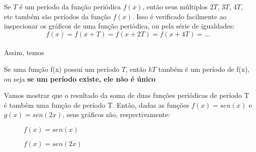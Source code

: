 Se $T$ é um período da função periódica $f(x)$, então seus múltiplos $2T$, $3T$, $4T$, etc 
também são períodos da função $f(x)$. Isso é verificado facilmente ao inspecionar 
os gráficos de uma função periódica, ou pela série de igualdades:\\
\begin{equation}
\label{prop2}
    f(x) = f(x + T) = f(x + 2T) = f(x + 4T) = ...
\end{equation} 
\\
Assim, temos\\
\begin{definicao}
    Se uma função f(x) possui um período $T$, então $kT$ também é um período de
    f(x), ou seja \textbf{se um período existe, ele não é único}
\end{definicao}

Vamos mostrar que o resultado da soma de duas funções periódicas de período T
é também uma função de período T. Então, dadas as funções $f(x) = sen(x)$ e $g(x) = sen(2x)$,
seus gráficos são, respectivamente:\\
\begin{figure}[H]
    \caption{$f(x)=sen(x)$}
    \label{fig:senx}
\end{figure}

\begin{figure}[H]
    \caption{$f(x)=sen(2x)$}
    \label{fig:sen2x}
\end{figure}

